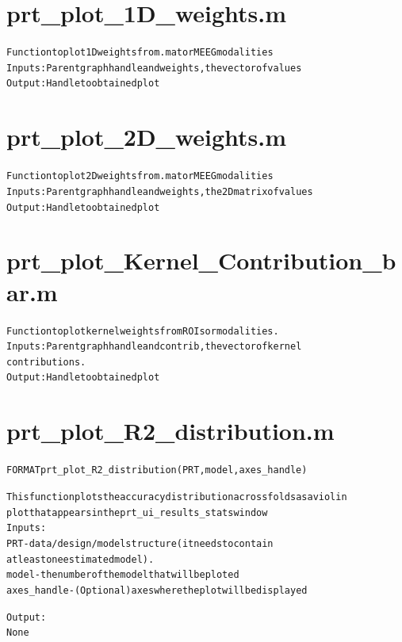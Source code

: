 \section{prt\_plot\_1D\_weights.m}
\begin{alltt}

 Function to plot 1D weights from .mat or MEEG modalities
 Inputs: Parent graph handle and weights, the vector of values
 Output: Handle to obtained plot
\end{alltt}


\section{prt\_plot\_2D\_weights.m}
\begin{alltt}

 Function to plot 2D weights from .mat or MEEG modalities
 Inputs: Parent graph handle and weights, the 2D matrix of values
 Output: Handle to obtained plot
\end{alltt}


\section{prt\_plot\_Kernel\_Contribution\_bar.m}
\begin{alltt}

 Function to plot kernel weights from ROIs or modalities.
 Inputs: Parent graph handle and contrib, the vector of kernel
 contributions.
 Output: Handle to obtained plot
\end{alltt}


\section{prt\_plot\_R2\_distribution.m}
\begin{alltt}

 FORMAT prt\_plot\_R2\_distribution(PRT, model, axes\_handle)
 
 This function plots the accuracy distribution across folds as a violin
 plot that appears in the prt\_ui\_results\_stats window
 Inputs:
       PRT             - data/design/model structure (it needs to contain
                         at least one estimated model).
       model           - the number of the model that will be ploted
       axes\_handle     - (Optional) axes where the plot will be displayed
 
 Output:
       None        
\end{alltt}


